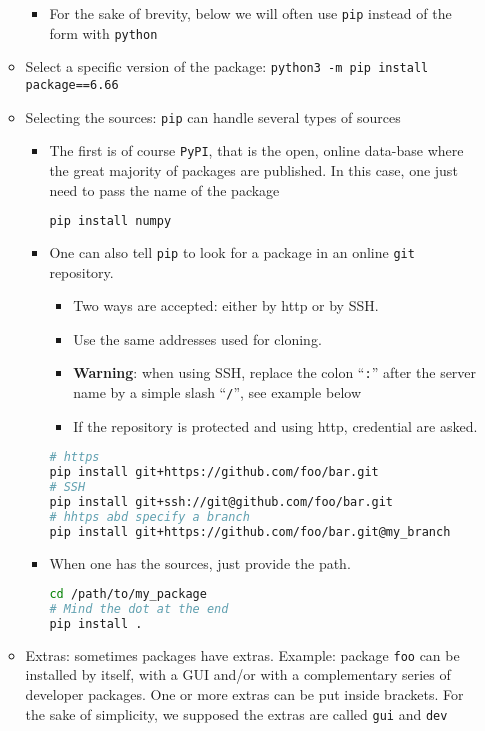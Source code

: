\documentclass[a4paper,12pt,%
              final%
              ]{article}
\begin{document}
\begin{itemize}
\begin{itemize}
        \begin{itemize}
          \item For the sake of brevity, below we will often use \texttt{pip} instead of the form with \texttt{python}
        \end{itemize}
      \item Select a specific version of the package: \verb|python3 -m pip install package==6.66|
      \item Selecting the sources: \texttt{pip} can handle several types of sources
        \begin{itemize}
          \item The first is of course \texttt{PyPI}, that is the open, online data-base where the great majority of packages are published. In this case, one just need to pass the name of the package
\begin{lstlisting}[language=bash]
pip install numpy
\end{lstlisting}
          \item One can also tell \texttt{pip} to look for a package in an online \texttt{git} repository.
            \begin{itemize}
              \item Two ways are accepted: either by http or by SSH.
              \item Use the same addresses used for cloning.
              \item \textbf{Warning}: when using SSH, replace the colon ``\texttt{:}'' after the server name by a simple slash ``\texttt{/}'', see example below
              \item If the repository is protected and using http, credential are asked.
            \end{itemize}
\begin{lstlisting}[language=bash]
# https
pip install git+https://github.com/foo/bar.git
# SSH
pip install git+ssh://git@github.com/foo/bar.git
# hhtps abd specify a branch
pip install git+https://github.com/foo/bar.git@my_branch
\end{lstlisting}
          \item When one has the sources, just provide the path.
\begin{lstlisting}[language=bash]
cd /path/to/my_package
# Mind the dot at the end
pip install .
\end{lstlisting}
        \end{itemize}
      \item Extras: sometimes packages have extras. Example: package \texttt{foo} can be installed by itself, with a GUI and/or with a complementary series of developer packages. One or more extras can be put inside brackets. For the sake of simplicity, we supposed the extras are called \texttt{gui} and \texttt{dev}

\end{itemize}
\end{itemize}
\end{document}
